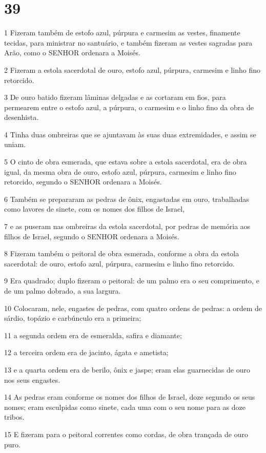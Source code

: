 \chapter{39}

\par 1 Fizeram também de estofo azul, púrpura e carmesim as vestes, finamente tecidas, para ministrar no santuário, e também fizeram as vestes sagradas para Arão, como o SENHOR ordenara a Moisés.
\par 2 Fizeram a estola sacerdotal de ouro, estofo azul, púrpura, carmesim e linho fino retorcido.
\par 3 De ouro batido fizeram lâminas delgadas e as cortaram em fios, para permearem entre o estofo azul, a púrpura, o carmesim e o linho fino da obra de desenhista.
\par 4 Tinha duas ombreiras que se ajuntavam às suas duas extremidades, e assim se uniam.
\par 5 O cinto de obra esmerada, que estava sobre a estola sacerdotal, era de obra igual, da mesma obra de ouro, estofo azul, púrpura, carmesim e linho fino retorcido, segundo o SENHOR ordenara a Moisés.
\par 6 Também se prepararam as pedras de ônix, engastadas em ouro, trabalhadas como lavores de sinete, com os nomes dos filhos de Israel,
\par 7 e as puseram nas ombreiras da estola sacerdotal, por pedras de memória aos filhos de Israel, segundo o SENHOR ordenara a Moisés.
\par 8 Fizeram também o peitoral de obra esmerada, conforme a obra da estola sacerdotal: de ouro, estofo azul, púrpura, carmesim e linho fino retorcido.
\par 9 Era quadrado; duplo fizeram o peitoral: de um palmo era o seu comprimento, e de um palmo dobrado, a sua largura.
\par 10 Colocaram, nele, engastes de pedras, com quatro ordens de pedras: a ordem de sárdio, topázio e carbúnculo era a primeira;
\par 11 a segunda ordem era de esmeralda, safira e diamante;
\par 12 a terceira ordem era de jacinto, ágata e ametista;
\par 13 e a quarta ordem era de berilo, ônix e jaspe; eram elas guarnecidas de ouro nos seus engastes.
\par 14 As pedras eram conforme os nomes dos filhos de Israel, doze segundo os seus nomes; eram esculpidas como sinete, cada uma com o seu nome para as doze tribos.
\par 15 E fizeram para o peitoral correntes como cordas, de obra trançada de ouro puro.
